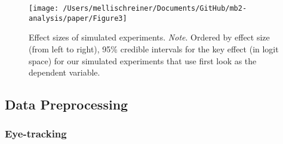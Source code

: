 \documentclass[
  english,
  man,floatsintext]{apa6}
\begin{document}
\begin{figure}

\texttt{[image: /Users/mellischreiner/Documents/GitHub/mb2-analysis/paper/Figure3]} \hfill{}

\caption{Effect sizes of simulated experiments. \newline{} \textit{Note}. Ordered by effect size (from left to right), 95\% credible intervals for the key effect (in logit space) for our simulated experiments that use first look as the dependent variable.}\label{fig:fig3}
\end{figure}

\hypertarget{data-preprocessing}{%
\subsection{Data Preprocessing}\label{data-preprocessing}}

\hypertarget{eye-tracking}{%
\subsubsection{Eye-tracking}\label{eye-tracking}}
\end{document}
